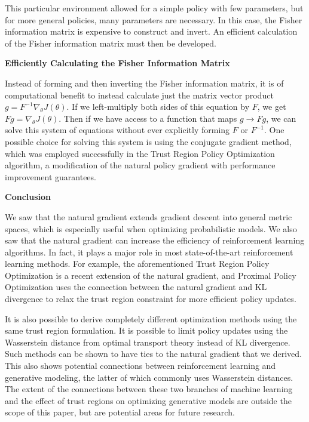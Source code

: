 \documentclass[twoside,10pt]{article}
\newcommand{\subheader}[1]{\bigskip\begin{center}\textbf{#1}\end{center}}
\begin{document}
This particular environment allowed for a simple policy with few parameters, but for more general policies, many parameters are necessary. In this case, the Fisher information matrix is expensive to construct and invert. An efficient calculation of the Fisher information matrix must then be developed.

\subheader{Efficiently Calculating the Fisher Information Matrix}

Instead of forming and then inverting the Fisher information matrix, it is of computational benefit to instead calculate just the matrix vector product $g = F^{-1} \nabla_\theta J(\theta)$. If we left-multiply both sides of this equation by $F$, we get $F g = \nabla_\theta J(\theta)$. Then if we have access to a function that maps $g \to F g$, we can solve this system of equations without ever explicitly forming $F$ or $F^{-1}$. One possible choice for solving this system is using the conjugate gradient method, which was employed successfully in the Trust Region Policy Optimization algorithm, a modification of the natural policy gradient with performance improvement guarantees\cite{trpo}.

\subheader{Conclusion}

We saw that the natural gradient extends gradient descent into general metric spaces, which is especially useful when optimizing probabilistic models. We also saw that the natural gradient can increase the efficiency of reinforcement learning algorithms. In fact, it plays a major role in most state-of-the-art reinforcement learning methods. For example, the aforementioned Trust Region Policy Optimization is a recent extension of the natural gradient\cite{trpo}, and Proximal Policy Optimization uses the connection between the natural gradient and KL divergence to relax the trust region constraint for more efficient policy updates\cite{ppo}.

It is also possible to derive completely different optimization methods using the same trust region formulation. It is possible to limit policy updates using the Wasserstein distance from optimal transport theory instead of KL divergence\cite{wgf}. Such methods can be shown to have ties to the natural gradient that we derived\cite{ng-ot}. This also shows potential connections between reinforcement learning and generative modeling, the latter of which commonly uses Wasserstein distances. The extent of the connections between these two branches of machine learning and the effect of trust regions on optimizing generative models are outside the scope of this paper, but are potential areas for future research.
\end{document}
